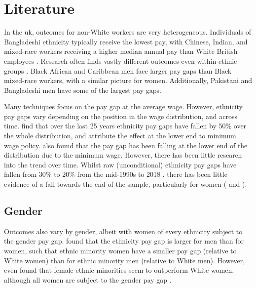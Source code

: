 \documentclass[class=article, crop=false]{standalone}
\begin{document}
\section{Literature}
\label{sec:Literature}
In the \acrshort{uk}, outcomes for non-White workers are very heterogeneous. Individuals of Bangladeshi ethnicity typically receive the lowest pay, with Chinese, Indian, and mixed-race workers receiving a higher median annual pay than White British employees \citep{ONSe}. Research often finds vastly different outcomes even within ethnic groups \citep{Heath}. Black African and Caribbean men face larger pay gaps than Black mixed-race workers, with a similar picture for women. Additionally, Pakistani and Bangladeshi men have some of the largest pay gaps. %

Many techniques focus on the pay gap at the average wage. However, ethnicity pay gaps vary depending on the position in the wage distribution, and across time. \citet{BoE} find that over the last 25 years ethnicity pay gaps have fallen by 50\% over the whole distribution, and attribute the effect at the lower end to minimum wage policy. \citet{Gove} also found that the pay gap has been falling at the lower end of the distribution due to the minimum wage. However, there has been little research into the trend over time. Whilst raw (unconditional) ethnicity pay gaps have fallen from 30\% to 20\% from the mid-1990s to 2018 \cite[p.~11]{BoE}, there has been little evidence of a fall towards the end of the sample, particularly for women (\citet{Metcalf} and \citet{Blackaby}).

\subsection{Gender}
\label{sec:Gender}
Outcomes also vary by gender, albeit with women of every ethnicity subject to the gender pay gap. \citet{Longhi3} found that the ethnicity pay gap is larger for men than for women, such that ethnic minority women have a smaller pay gap (relative to White women) than for ethnic minority men (relative to White men). However, \citet{Metcalf} even found that female ethnic minorities seem to outperform White women, although all women are subject to the gender pay gap \citep{Heath}. %

\end{document}
